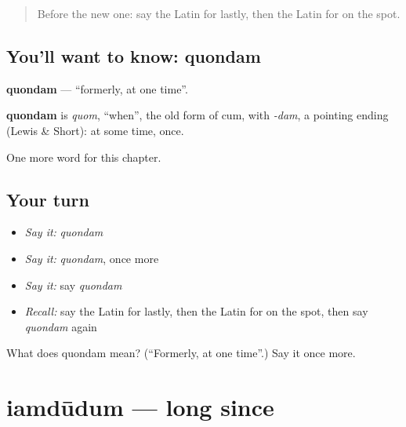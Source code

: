 \label{lesson:LA-C208-quondam}



\begin{quote}
Before the new one: say the Latin for lastly, then the Latin for on the spot.
\end{quote}

\subsection*{You'll want to know: quondam}
\textbf{quondam} — \textquotedblleft{}formerly, at one time\textquotedblright{}.

\begin{cousinweb}
\textbf{quondam} is \emph{quom}, \textquotedblleft{}when\textquotedblright{}, the old form of cum, with \emph{-dam}, a pointing ending (Lewis \& Short): at some time, once.
\end{cousinweb}

\begin{grammarlens}[title={What you've built}]
One more word for this chapter.
\end{grammarlens}

\subsection*{Your turn}
\begin{itemize}
\raggedright
  \item \emph{Say it:} \emph{quondam}
  \item \emph{Say it:} \emph{quondam}, once more
  \item \emph{Say it:} say \emph{quondam}
  \item \emph{Recall:} say the Latin for lastly, then the Latin for on the spot, then say \emph{quondam} again
\end{itemize}

\begin{tcolorbox}[breakable,colback=teal!4,colframe=teal!35!black,title={Before you move on}]
What does quondam mean? (\textquotedblleft{}Formerly, at one time\textquotedblright{}.) Say it once more.
\end{tcolorbox}
\section[iamdūdum]{iamdūdum — long since}

\label{lesson:LA-C208-iamdudum}



